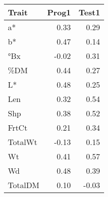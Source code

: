 \begin{table}[ht]
\centering
\begin{tabular}{lrr}
  \hline
Trait & Prog1 & Test1 \\ 
  \hline
a* & 0.33 & 0.29 \\ 
  b* & 0.47 & 0.14 \\ 
  °Bx & -0.02 & 0.31 \\ 
  \%DM & 0.44 & 0.27 \\ 
  L* & 0.48 & 0.25 \\ 
  Len & 0.32 & 0.54 \\ 
  Shp & 0.38 & 0.52 \\ 
  FrtCt & 0.21 & 0.34 \\ 
  TotalWt & -0.13 & 0.15 \\ 
  Wt & 0.41 & 0.57 \\ 
  Wd & 0.48 & 0.39 \\ 
  TotalDM & 0.10 & -0.03 \\ 
   \hline
\end{tabular}
\end{table}
